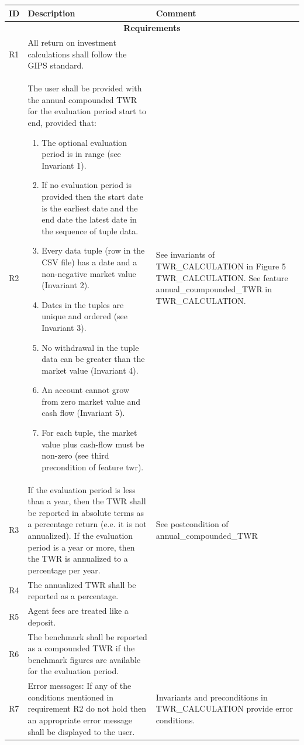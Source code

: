\documentclass[runningheads,12pt]{article}
\begin{document}
\centering
\begin{tabular}{|l|p{9cm}|p{5cm}|}
\hline
\textbf{ID} & \textbf{Description} & \textbf{Comment}\\

\hline
\multicolumn{3}{|c|}{\textbf{Requirements}}\\

\hline
R1 & All return on investment calculations shall follow the GIPS standard. & \\

\hline
R2 & The user shall be provided with the annual compounded TWR for the evaluation period start to end, provided that:
\begin{enumerate}
\item The optional evaluation period is in range (see Invariant 1).
\item If no evaluation period is provided then the start date is the earliest date and the end date the latest date in the sequence of tuple data.
\item Every data tuple (row in the CSV file) has a date and a non-negative market value (Invariant 2).
\item Dates in the tuples are unique and ordered (see Invariant 3).
\item No withdrawal in the tuple data can be greater than the market value (Invariant 4).
\item An account cannot grow from zero market value and cash flow (Invariant 5).
\item For each tuple, the market value plus cash-flow must be non-zero (see third precondition of feature twr).
\end{enumerate}
& See invariants of TWR\_CALCULATION in Figure 5 TWR\_CALCULATION. See feature annual\_coumpounded\_TWR in TWR\_CALCULATION.\\

\hline
R3 & If the evaluation period is less than a year, then the TWR shall be reported in absolute terms as a percentage return (e.e. it is not annualized). If the evaluation period is a year or more, then the TWR is annualized to a percentage per year. & See postcondition of annual\_compounded\_TWR \\

\hline
R4 & The annualized TWR shall be reported as a percentage. & \\

\hline
R5 & Agent fees are treated like a deposit. & \\

\hline
R6 & The benchmark shall be reported as a compounded TWR if the benchmark figures are available for the evaluation period. & \\

\hline
R7 & Error messages: If any of the conditions mentioned in requirement R2 do not hold then an appropriate error message shall be displayed to the user. & Invariants and preconditions in TWR\_CALCULATION provide error conditions.\\




\hline
\end{tabular}
\end{document}
